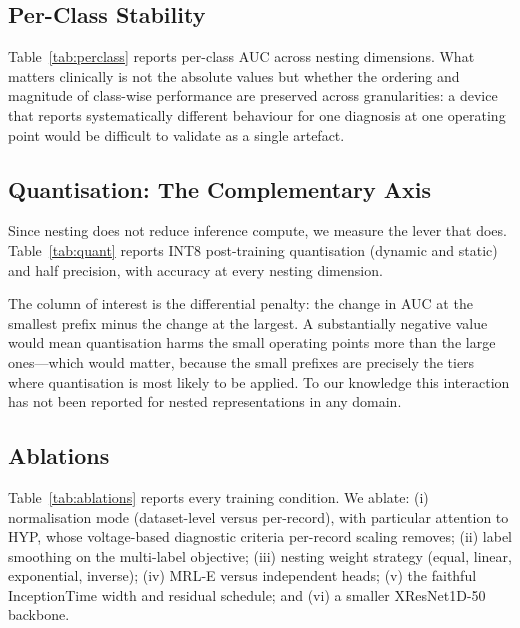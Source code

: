 \subsection{Per-Class Stability}

Table~\ref{tab:perclass} reports per-class AUC across nesting dimensions. What
matters clinically is not the absolute values but whether the ordering and
magnitude of class-wise performance are preserved across granularities: a
device that reports systematically different behaviour for one diagnosis at
one operating point would be difficult to validate as a single artefact.



\subsection{Quantisation: The Complementary Axis}
\label{sec:quant}

Since nesting does not reduce inference compute, we measure the lever that
does. Table~\ref{tab:quant} reports INT8 post-training quantisation (dynamic
and static) and half precision, with accuracy at every nesting dimension.



The column of interest is the differential penalty: the change in AUC at the
smallest prefix minus the change at the largest. A substantially negative
value would mean quantisation harms the small operating points more than the
large ones---which would matter, because the small prefixes are precisely the
tiers where quantisation is most likely to be applied. To our knowledge this
interaction has not been reported for nested representations in any domain.

\subsection{Ablations}
\label{sec:ablations}

Table~\ref{tab:ablations} reports every training condition. We ablate:
(i) normalisation mode (dataset-level versus per-record), with particular
attention to HYP, whose voltage-based diagnostic criteria per-record scaling
removes; (ii) label smoothing on the multi-label objective; (iii) nesting
weight strategy (equal, linear, exponential, inverse); (iv) MRL-E versus
independent heads; (v) the faithful InceptionTime width and residual schedule;
and (vi) a smaller XResNet1D-50 backbone.


